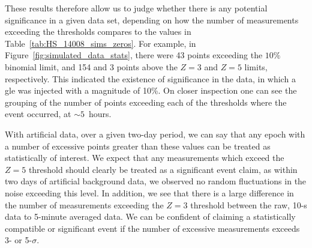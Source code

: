 These results therefore allow us to judge whether there is any potential significance in a given data set, depending on how the number of measurements exceeding the thresholds compares to the values in Table~\ref{tab:HS_14008_sims_zeros}. For example, in Figure~\ref{fig:simulated_data_stats}, there were 43 points exceeding the $10 \%$ binomial limit, and 154 and 3 points above the $Z=3$ and $Z=5$ limits, respectively. This indicated the existence of significance in the data, in which a \gls{gle} was injected with a magnitude of 10\%. On closer inspection one can see the grouping of the number of points exceeding each of the thresholds where the event occurred, at $\sim5$~hours. 


With artificial data, over a given two-day period, we can say that any epoch with a number of excessive points greater than these values can be treated as statistically of interest. We expect that any measurements which exceed the $Z=5$ threshold should clearly be treated as a significant event claim, as within two days of artificial background data, we observed no random fluctuations in the noise exceeding this level. In addition, we see that there is a large difference in the number of measurements exceeding the $Z=3$ threshold between the raw, 10-s data to 5-minute averaged data. We can be confident of claiming a statistically compatible or significant event if the number of excessive measurements exceeds 3- or 5-$\sigma$. %

